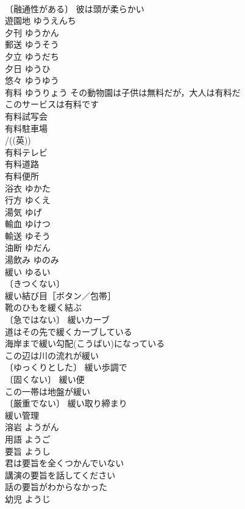 \documentclass[8pt]{extreport}
\begin{document}
\begin{CJK}{UTF8}{min}
\\	〔融通性がある〕 彼は頭が柔らかい 
\\	遊園地	ゆうえんち	
\\	夕刊	ゆうかん	
\\	郵送	ゆうそう	
\\	夕立	ゆうだち	
\\	夕日	ゆうひ	
\\	悠々	ゆうゆう	
\\	有料	ゆうりょう	その動物園は子供は無料だが，大人は有料だ 
\\	このサービスは有料です 
\\	有料試写会 
\\	有料駐車場 
\\	/((英)) 
\\	有料テレビ 
\\	有料道路 
\\	有料便所 
\\	浴衣	ゆかた	
\\	行方	ゆくえ	
\\	湯気	ゆげ	
\\	輸血	ゆけつ	
\\	輸送	ゆそう	
\\	油断	ゆだん	
\\	湯飲み	ゆのみ	
\\	緩い	ゆるい	
\\	〔きつくない〕
\\	緩い結び目［ボタン／包帯］ 
\\	靴のひもを緩く結ぶ 
\\	〔急ではない〕 緩いカーブ 
\\	道はその先で緩くカーブしている 
\\	海岸まで緩い勾配(こうばい)になっている 
\\	この辺は川の流れが緩い 
\\	〔ゆっくりとした〕 緩い歩調で 
\\	〔固くない〕 緩い便 
\\	この一帯は地盤が緩い 
\\	〔厳重でない〕 緩い取り締まり 
\\	緩い管理 
\\	溶岩	ようがん	
\\	用語	ようご	
\\	要旨	ようし	
\\	君は要旨を全くつかんでいない 
\\	講演の要旨を話してください 
\\	話の要旨がわからなかった 
\\	幼児	ようじ	

\end{CJK}
\end{document}
